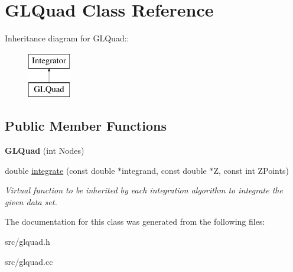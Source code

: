 \hypertarget{classGLQuad}{
\section{GLQuad Class Reference}
\label{db/d06/classGLQuad}
}
Inheritance diagram for GLQuad::\begin{figure}[H]
\begin{center}
\leavevmode
\includegraphics[height=2cm]{db/d06/classGLQuad}
\end{center}
\end{figure}
\subsection*{Public Member Functions}
\begin{DoxyCompactItemize}
\item 
\hypertarget{classGLQuad_a835d29af2507b6b2716794d3371d2ba8}{
{\bfseries GLQuad} (int Nodes)}
\label{db/d06/classGLQuad_a835d29af2507b6b2716794d3371d2ba8}

\item 
\hypertarget{classGLQuad_a951e36d849cfadc749a62218212802b6}{
double \hyperlink{classGLQuad_a951e36d849cfadc749a62218212802b6}{integrate} (const double $\ast$integrand, const double $\ast$Z, const int ZPoints)}
\label{db/d06/classGLQuad_a951e36d849cfadc749a62218212802b6}

\begin{DoxyCompactList}\small\item\em Virtual function to be inherited by each integration algorithm to integrate the given data set. \item\end{DoxyCompactList}\end{DoxyCompactItemize}


The documentation for this class was generated from the following files:\begin{DoxyCompactItemize}
\item 
src/glquad.h\item 
src/glquad.cc\end{DoxyCompactItemize}
